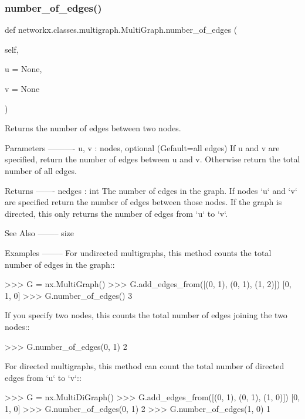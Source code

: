 \subsubsection{\texorpdfstring{number\+\_\+of\+\_\+edges()}{number\_of\_edges()}}
{\footnotesize\ttfamily def networkx.\+classes.\+multigraph.\+Multi\+Graph.\+number\+\_\+of\+\_\+edges (\begin{DoxyParamCaption}\item[{}]{self,  }\item[{}]{u = {\ttfamily None},  }\item[{}]{v = {\ttfamily None} }\end{DoxyParamCaption})}

\begin{DoxyVerb}Returns the number of edges between two nodes.

Parameters
----------
u, v : nodes, optional (Gefault=all edges)
    If u and v are specified, return the number of edges between
    u and v. Otherwise return the total number of all edges.

Returns
-------
nedges : int
    The number of edges in the graph.  If nodes `u` and `v` are
    specified return the number of edges between those nodes. If
    the graph is directed, this only returns the number of edges
    from `u` to `v`.

See Also
--------
size

Examples
--------
For undirected multigraphs, this method counts the total number
of edges in the graph::

    >>> G = nx.MultiGraph()
    >>> G.add_edges_from([(0, 1), (0, 1), (1, 2)])
    [0, 1, 0]
    >>> G.number_of_edges()
    3

If you specify two nodes, this counts the total number of edges
joining the two nodes::

    >>> G.number_of_edges(0, 1)
    2

For directed multigraphs, this method can count the total number
of directed edges from `u` to `v`::

    >>> G = nx.MultiDiGraph()
    >>> G.add_edges_from([(0, 1), (0, 1), (1, 0)])
    [0, 1, 0]
    >>> G.number_of_edges(0, 1)
    2
    >>> G.number_of_edges(1, 0)
    1\end{DoxyVerb}
 \mbox{\label{classnetworkx_1_1classes_1_1multigraph_1_1MultiGraph_ad6b782513b6d265485cda61ce06e7113}} 

